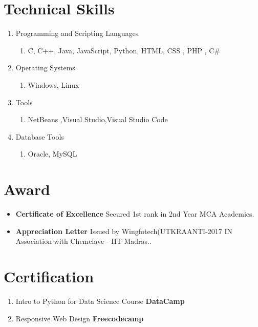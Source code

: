 \documentclass[a4paper,12pt]{article}
\begin{document}
\section{Technical Skills}
\begin{enumerate}
    \item Programming and Scripting Languages
    \begin{enumerate}
        \item [\ding{226}] C, C++, Java, JavaScript, Python, HTML, 
        CSS , PHP , C\#
    \end{enumerate}
    \item  Operating Systems
    \begin{enumerate}
        \item[\ding{226}] Windows, Linux
    \end{enumerate}
    \item Tools
    \begin{enumerate}
        \item [\ding{226}] NetBeans ,Visual Studio,Visual Studio Code
    \end{enumerate}
    \item Database Tools
    \begin{enumerate}
        \item [\ding{226}] Oracle, MySQL
    \end{enumerate}
\end{enumerate}
\section{Award}
\begin{itemize}
    \item[\ding{51}]\textbf {Certificate of Excellence} Secured 1st 
    rank in 2nd Year MCA Academics.
    \item[\ding{51}]\textbf {Appreciation Letter}
	Issued by Wingfotech(UTKRAANTI-2017 IN Association with Chemclave 	- IIT Madras..
\end{itemize}
\section{Certification}
\begin{enumerate}
    \item Intro to Python for Data Science Course \textbf{DataCamp}
    \item Responsive Web Design \textbf{Freecodecamp}
   
\end{enumerate}
\end{document}
